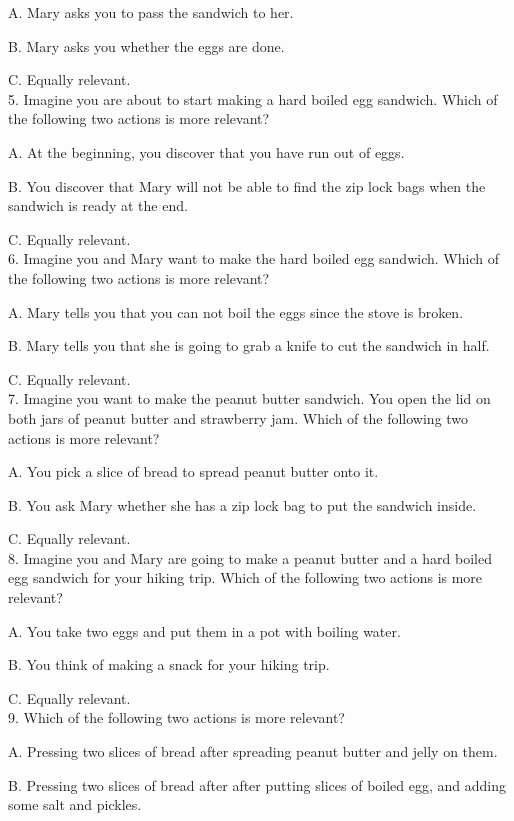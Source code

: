 \documentclass[12pt]{report}
\begin{document}
\begin{appendices}
A. Mary asks you to pass the sandwich to her.

B. Mary asks you whether the eggs are done.

C. Equally relevant.\\


5. Imagine you are about to start making a hard boiled egg sandwich. Which of the following two actions is more relevant?

A. At the beginning, you discover that you have run out of eggs.

B. You discover that Mary will not be able to find the zip lock bags when the sandwich is ready at the end.

C. Equally relevant.\\


6. Imagine you and Mary want to make the hard boiled egg sandwich. Which of the following two actions is more relevant?

A. Mary tells you that you can not boil the eggs since the stove is broken.

B. Mary tells you that she is going to grab a knife to cut the sandwich in half.

C. Equally relevant.\\


7. Imagine you want to make the peanut butter sandwich. You open the lid on both jars of peanut butter and strawberry jam. Which of the following two actions is more relevant?

A. You pick a slice of bread to spread peanut butter onto it.

B. You ask Mary whether she has a zip lock bag to put the sandwich inside.

C. Equally relevant.\\


8. Imagine you and Mary are going to make a peanut butter and a hard boiled egg sandwich for your hiking trip. Which of the following two actions is more relevant?

A. You take two eggs and put them in a pot with boiling water.

B. You think of making a snack for your hiking trip.

C. Equally relevant.\\


9. Which of the following two actions is more relevant?

A. Pressing two slices of bread after spreading peanut butter and jelly on them.

B.  Pressing two slices of bread after after putting slices of boiled egg, and adding some salt and pickles.


\end{appendices}
\end{document}
